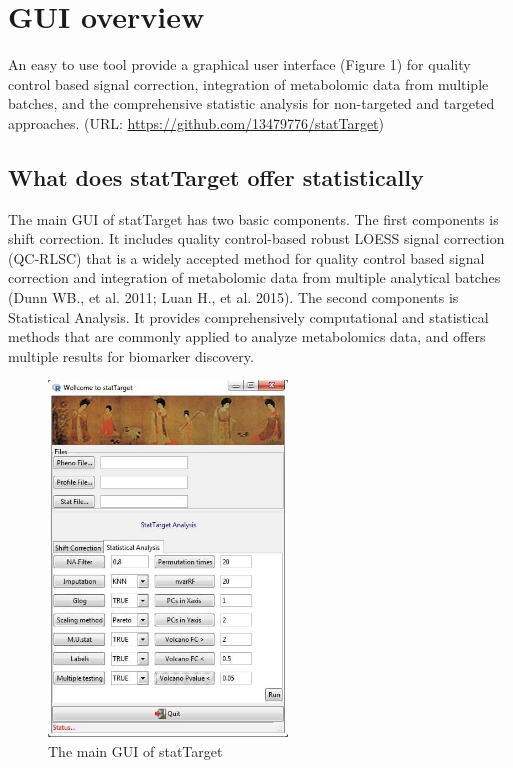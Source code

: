 \documentclass[english]{article}
\begin{document}
\newpage 

\section[GUI overview]{GUI overview}
 

An easy to use tool provide a graphical user interface (Figure 1) for 
quality control based signal correction, integration of metabolomic 
data from multiple batches, and the comprehensive statistic analysis 
for non-targeted and targeted approaches. 
(URL: \url{https://github.com/13479776/statTarget})

\subsection[What does statTarget offer statistically]{
What does statTarget offer statistically}


The main GUI of statTarget has two basic components. The first components 
is shift correction. It includes quality control-based robust LOESS signal 
correction (QC-RLSC) that is a widely accepted method for quality control 
based signal correction and integration of metabolomic data from multiple 
analytical batches (Dunn WB., et al. 2011; Luan H., et al. 2015). The second 
components is Statistical Analysis. It provides comprehensively computational 
and statistical methods that are commonly applied to analyze metabolomics data,
and offers multiple results for biomarker discovery.


\begin{figure}

\centering

\includegraphics[width=2.5in]{statTarget}

\caption{\label{fig:statTarget}The main GUI of statTarget}

\end{figure}
\end{document}
